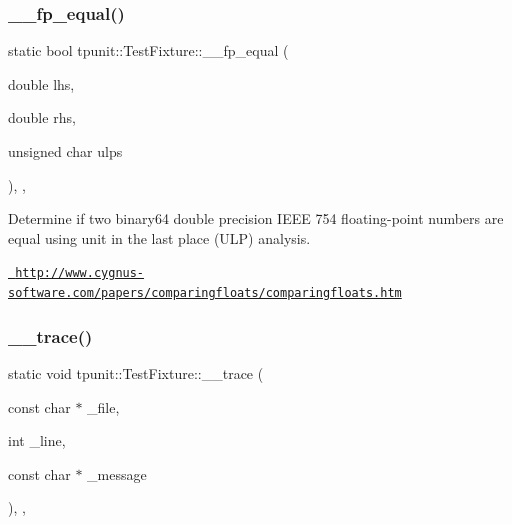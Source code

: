 \subsubsection{\texorpdfstring{\_\_fp\_equal()}{\_\_fp\_equal()}\hspace{0.1cm}{\footnotesize\ttfamily [2/2]}}
{\footnotesize\ttfamily static bool tpunit\+::\+Test\+Fixture\+::\+\_\+\+\_\+fp\+\_\+equal (\begin{DoxyParamCaption}\item[{double}]{lhs,  }\item[{double}]{rhs,  }\item[{unsigned char}]{ulps }\end{DoxyParamCaption})\hspace{0.3cm}{\ttfamily [inline]}, {\ttfamily [static]}, {\ttfamily [protected]}}



Determine if two binary64 double precision I\+E\+EE 754 floating-\/point numbers are equal using unit in the last place (U\+LP) analysis. 

\href{http://www.cygnus-software.com/papers/comparingfloats/comparingfloats.htm}{\texttt{ http\+://www.\+cygnus-\/software.\+com/papers/comparingfloats/comparingfloats.\+htm}} \mbox{\label{classtpunit_1_1TestFixture_acc41c68bf4068ec295aa6dc5e4c3b37a}} 
\subsubsection{\texorpdfstring{\_\_trace()}{\_\_trace()}}
{\footnotesize\ttfamily static void tpunit\+::\+Test\+Fixture\+::\+\_\+\+\_\+trace (\begin{DoxyParamCaption}\item[{const char $\ast$}]{\+\_\+file,  }\item[{int}]{\+\_\+line,  }\item[{const char $\ast$}]{\+\_\+message }\end{DoxyParamCaption})\hspace{0.3cm}{\ttfamily [inline]}, {\ttfamily [static]}, {\ttfamily [protected]}}

\mbox{\label{classtpunit_1_1TestFixture_a509cf528b20c220485c9d9bb509d8c8b}} 
